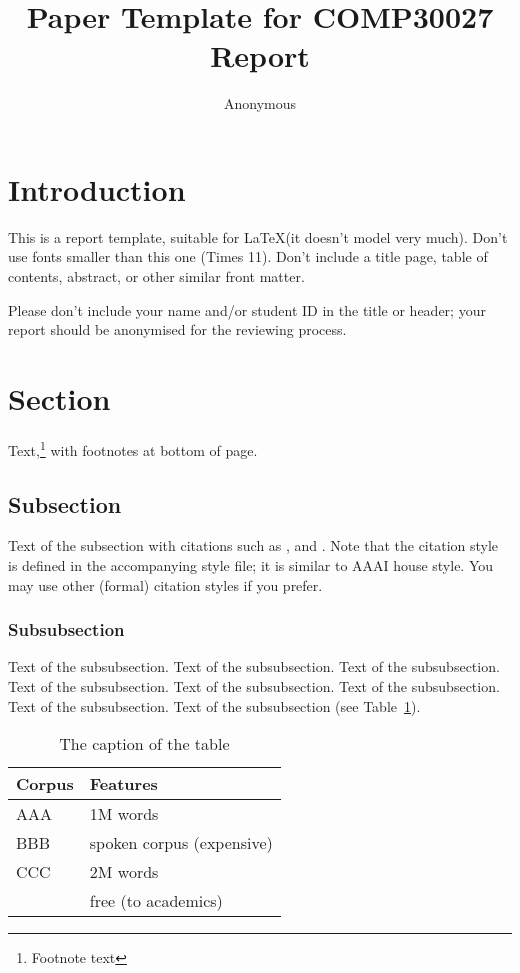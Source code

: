 \documentclass[11pt]{article}
\title{Paper Template for COMP30027 Report}
\author
{Anonymous}
\begin{document}
\maketitle



\section{Introduction}

This is a report template, suitable for \LaTeX (it doesn't model very much).
Don't use fonts smaller than this one (Times 11). Don't include a title page,
table of contents, abstract, or other similar front matter.

Please don't include your name and/or student ID in the title or header; 
your report should be anonymised for the reviewing process.


\section{Section}

Text,\footnote{Footnote text} with footnotes at bottom of page.


\subsection{Subsection}

Text of the subsection with citations such as 
,  and .
Note that the citation style is defined in the accompanying
style file; it is similar to AAAI house style. You may use
other (formal) citation styles if you prefer.

 
\subsubsection{Subsubsection}

Text of the subsubsection.
Text of the subsubsection.
Text of the subsubsection.
Text of the subsubsection.
Text of the subsubsection.
Text of the subsubsection.
Text of the subsubsection.
Text of the subsubsection (see Table~\ref{table1}).

\begin{table}[h]
 \begin{center}
\begin{tabular}{|l|l|}

      \hline
      Corpus & Features\\
      \hline\hline
      AAA & 1M words\\
      BBB & spoken corpus (expensive)\\
      CCC & 2M words\\
        & free (to academics)\\
      \hline

\end{tabular}
\caption{The caption of the table}\label{table1}
 \end{center}
\end{table}
\end{document}
